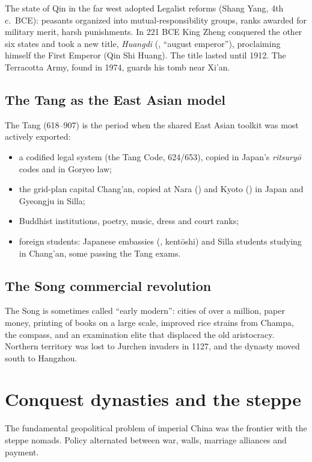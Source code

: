 The state of Qin in the far west adopted Legalist reforms (Shang Yang, 4th c.\ BCE):
peasants organized into mutual-responsibility groups, ranks awarded for military merit,
harsh punishments. In 221 BCE King Zheng conquered the other six states and took a new
title, \emph{Huangdi} (, ``august emperor''), proclaiming himself the First
Emperor (Qin Shi Huang). The title lasted until 1912. The Terracotta Army, found in 1974,
guards his tomb near Xi'an.

\subsection{The Tang as the East Asian model}

The Tang (618--907) is the period when the shared East Asian toolkit was most actively
exported:

\begin{itemize}
  \item a codified legal system (the Tang Code, 624/653), copied in Japan's
        \emph{ritsuryō} codes and in Goryeo law;
  \item the grid-plan capital Chang'an, copied at Nara () and Kyoto
        () in Japan and Gyeongju in Silla;
  \item Buddhist institutions, poetry, music, dress and court ranks;
  \item foreign students: Japanese embassies (, kentōshi) and Silla students
        studying in Chang'an, some passing the Tang exams.
\end{itemize}

\subsection{The Song commercial revolution}

The Song is sometimes called ``early modern'': cities of over a million, paper money,
printing of books on a large scale, improved rice strains from Champa, the compass, and an
examination elite that displaced the old aristocracy. Northern territory was lost to
Jurchen invaders in 1127, and the dynasty moved south to Hangzhou.

\section{Conquest dynasties and the steppe}

The fundamental geopolitical problem of imperial China was the frontier with the steppe
nomads. Policy alternated between war, walls, marriage alliances and payment.

